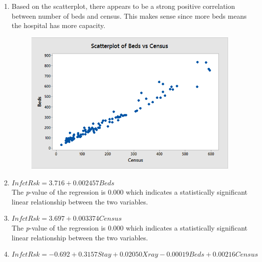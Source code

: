 \documentclass{article}
\begin{document}
\begin{enumerate}
\def\labelenumi{\alph{enumi})}
\item
  Based on the scatterplot, there appears to be a strong positive
  correlation between number of beds and census. This makes sense since
  more beds means the hospital has more capacity. 
  
  \begin{figure}[h!]
 \centering
 \includegraphics[scale=.5]{./images/scatterplot_beds-vs-census.png}
\end{figure}

\item
  \(InfctRsk = 3.716 + 0.002457 Beds\) \\ The \emph{p}-value of the
  regression is 0.000 which indicates a statistically significant linear
  relationship between the two variables.
\item
  \(InfctRsk = 3.697 + 0.003374 Census\) \\ The \emph{p}-value of the
  regression is 0.000 which indicates a statistically significant linear
  relationship between the two variables.
\item
  \(InfctRsk = -0.692 + 0.3157 Stay + 0.02050 Xray - 0.00019 Beds + 0.00216 Census\)


\end{enumerate}
\end{document}
